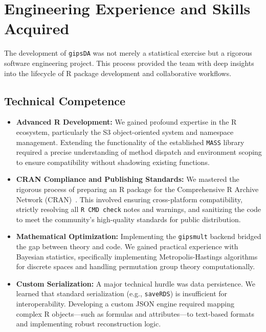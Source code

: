\documentclass[a4paper,11pt,twoside]{report}
\theoremstyle{definition}
\begin{document}
\section{Engineering Experience and Skills Acquired}
\label{sec:project_experience}

The development of \texttt{gipsDA} was not merely a statistical exercise but a rigorous software engineering project. This process provided the team with deep insights into the lifecycle of R package development and collaborative workflows.

\subsection{Technical Competence}
\begin{itemize}
    \item \textbf{Advanced R Development:} We gained profound expertise in the R ecosystem, particularly the S3 object-oriented system and namespace management. Extending the functionality of the established \texttt{MASS} library required a precise understanding of method dispatch and environment scoping to ensure compatibility without shadowing existing functions.
    \item \textbf{CRAN Compliance and Publishing Standards:} We mastered the rigorous process of preparing an R package for the Comprehensive R Archive Network (CRAN)~\cite{CRAN}. This involved ensuring cross-platform compatibility, strictly resolving all \texttt{R CMD check} notes and warnings, and sanitizing the code to meet the community's high-quality standards for public distribution.
    \item \textbf{Mathematical Optimization:} Implementing the \texttt{gipsmult} backend bridged the gap between theory and code. We gained practical experience with Bayesian statistics, specifically implementing Metropolis-Hastings algorithms for discrete spaces and handling permutation group theory computationally.
    \item \textbf{Custom Serialization:} A major technical hurdle was data persistence. We learned that standard serialization (e.g., \texttt{saveRDS}) is insufficient for interoperability. Developing a custom JSON engine required mapping complex R objects—such as formulas and attributes—to text-based formats and implementing robust reconstruction logic.
\end{itemize}
\end{document}
